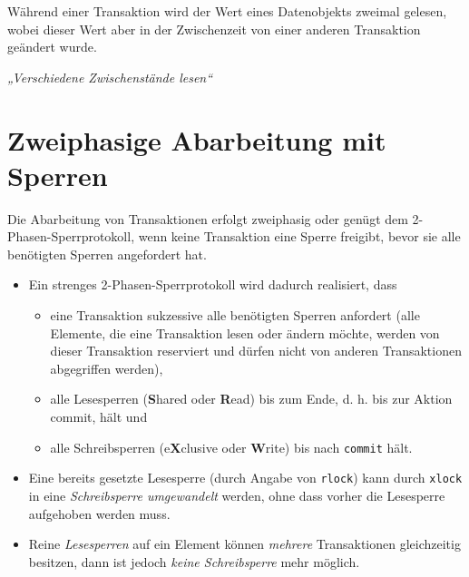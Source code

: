 \documentclass{lehramt-informatik}
\begin{document}
Während einer Transaktion wird der Wert eines Datenobjekts zweimal
gelesen, wobei dieser Wert aber in der Zwischenzeit von einer anderen
Transaktion geändert wurde.

\emph{„Verschiedene Zwischenstände lesen“}

%

\section{Zweiphasige Abarbeitung mit Sperren}

\cite[Seite 15]{db:fs:5}

Die Abarbeitung von Transaktionen erfolgt zweiphasig oder genügt dem
2-Phasen-Sperrprotokoll, wenn keine Transaktion eine Sperre freigibt,
bevor sie alle benötigten Sperren angefordert hat.

\begin{itemize}
\item Ein strenges 2-Phasen-Sperrprotokoll wird dadurch realisiert, dass

\begin{itemize}
\item eine Transaktion sukzessive alle benötigten Sperren anfordert
(alle Elemente, die eine Transaktion lesen oder ändern möchte, werden
von dieser Transaktion reserviert und dürfen nicht von anderen
Transaktionen abgegriffen werden),

\item alle Lesesperren (\textbf{S}hared oder \textbf{R}ead) bis zum
Ende, d. h. bis zur Aktion commit, hält und

\item alle Schreibsperren (e\textbf{X}clusive oder \textbf{W}rite) bis
nach \texttt{commit} hält.
\end{itemize}

\item Eine bereits gesetzte Lesesperre (durch Angabe von \texttt{rlock})
kann durch \texttt{xlock} in eine \emph{Schreibsperre umgewandelt}
werden, ohne dass vorher die Lesesperre aufgehoben werden muss.

\item Reine \emph{Lesesperren} auf ein Element können \emph{mehrere}
Transaktionen gleichzeitig besitzen, dann ist jedoch \emph{keine
Schreibsperre} mehr möglich.
\end{itemize}
\end{document}
